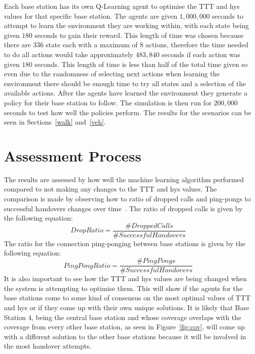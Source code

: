 Each base station has its own Q-Learning agent to optimise the TTT and hys values for that specific base station. The agents are given $1,000,000$ seconds to attempt to learn the environment they are working within, with each state being given $180$ seconds to gain their reward. This length of time was chosen because there are 336 state each with a maximum of 8 actions, therefore the time needed to do all actions would take approximately $483,840$ seconds if each action was given $180$ seconds. This length of time is less than half of the total time given so even due to the randomness of selecting next actions when learning the environment there should be enough time to try all states and a selection of the available actions. After the agents have learned the environment they generate a policy for their base station to follow. The simulation is then run for $200,000$ seconds to test how well the policies perform. The results for the scenarios can be seen in Sections~\ref{walk} and~\ref{veh}.
\section{Assessment Process}\label{results}
The results are assessed by how well the machine learning algorithm performed compared to not making any changes to the TTT and hys values. The comparison is made by observing how to ratio of dropped calls and ping-pongs to successful handovers changes over time~\cite{sinclair2013advanced}. The ratio of dropped calls is given by the following equation:
\begin{equation}\label{eq:drop}
Drop Ratio = \frac{\#Dropped Calls}{\#Successful Handovers}
\end{equation}
The ratio for the connection ping-ponging between base stations is given by the following equation:
\begin{equation}\label{eq:ping}
PingPong Ratio = \frac{\#PingPongs}{\#Successful Handovers}
\end{equation}
It is also important to see how the TTT and hys values are being changed when the system is attempting to optimise them. This will show if the agents for the base stations come to some kind of consensus on the most optimal values of TTT and hys or if they come up with their own unique solutions. It is likely that Base Station 4, being the central base station and whose coverage overlaps with the coverage from every other base station, as seen in Figure~\ref{fig:cov}, will come up with a different solution to the other base stations because it will be involved in the most handover attempts.

